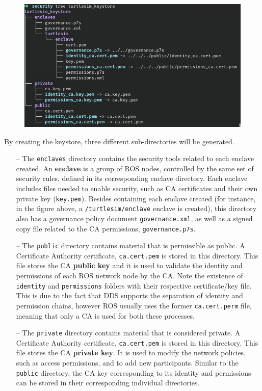 \begin{figure}[H]
    \centering
    \includegraphics[width=0.6\linewidth]{images/ts_keystore_tree.png}
\end{figure}

By creating the keystore, three different sub-directories will be generated.

\begin{itemize}
    \item[--] The \texttt{enclaves} directory contains the security tools related to each enclave created. An \textbf{enclave} is a group of ROS nodes, controlled by the same set of security rules, defined in its corresponding enclave directory. Each enclave includes files needed to enable security, such as CA certificates and their own private key (\texttt{key.pem}). Besides containing each enclave created (for instance, in the figure above, a \texttt{/turtlesim/enclave} enclave is created), this directory also has a governance policy document \texttt{governance.xml}, as well as a signed copy file related to the CA permissions, \texttt{governance.p7s}. 
    \item[--] The \texttt{public} directory contains material that is permissible as public. A Certificate Authority certificate, \texttt{ca.cert.pem} is stored in this directory. This file stores the CA \textbf{public key} and it is used to validate the identity and permissions of each ROS network node by the CA. Note the existence of \texttt{identity} and \texttt{permissions} folders with their respective certificate/key file. This is due to the fact that DDS supports the separation of identity and permission chains, however ROS usually uses the former \texttt{ca.cert.perm} file, meaning that only a CA is used for both these processes.
    \item[--] The \texttt{private} directory contains material that is considered private. A Certificate Authority certificate, \texttt{ca.cert.pem} is stored in this directory. This file stores the CA \textbf{private key}. It is used to modify the network policies, such as access permissions, and to add new participants. Similar to the \texttt{public} directory, the CA key corresponding to its identity and permissions can be stored in their corresponding individual directories.
\end{itemize}
            
